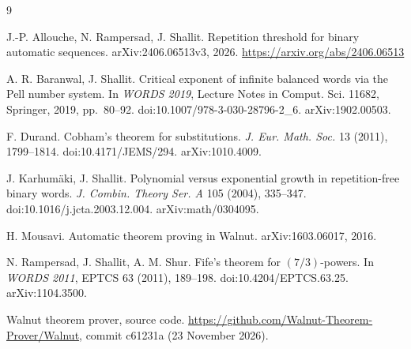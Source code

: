 \documentclass[11pt]{article}
\theoremstyle{definition}
\theoremstyle{remark}
\begin{document}
\begin{thebibliography}{9}

J.-P. Allouche, N. Rampersad, J. Shallit.
\newblock Repetition threshold for binary automatic sequences.
\newblock arXiv:2406.06513v3, 2026. \url{https://arxiv.org/abs/2406.06513}

A. R. Baranwal, J. Shallit.
\newblock Critical exponent of infinite balanced words via the Pell number system.
\newblock In \emph{WORDS 2019}, Lecture Notes in Comput. Sci. 11682, Springer, 2019, pp.~80--92. doi:10.1007/978-3-030-28796-2\_6. arXiv:1902.00503.

F. Durand.
\newblock Cobham's theorem for substitutions.
\newblock \emph{J. Eur. Math. Soc.} 13 (2011), 1799--1814. doi:10.4171/JEMS/294. arXiv:1010.4009.

J. Karhum\"aki, J. Shallit.
\newblock Polynomial versus exponential growth in repetition-free binary words.
\newblock \emph{J. Combin. Theory Ser. A} 105 (2004), 335--347. doi:10.1016/j.jcta.2003.12.004. arXiv:math/0304095.

H. Mousavi.
\newblock Automatic theorem proving in Walnut.
\newblock arXiv:1603.06017, 2016.

N. Rampersad, J. Shallit, A. M. Shur.
\newblock Fife's theorem for $(7/3)$-powers.
\newblock In \emph{WORDS 2011}, EPTCS 63 (2011), 189--198. doi:10.4204/EPTCS.63.25. arXiv:1104.3500.

Walnut theorem prover, source code.
\newblock \url{https://github.com/Walnut-Theorem-Prover/Walnut}, commit c61231a (23 November 2026).

\end{thebibliography}
\end{document}
